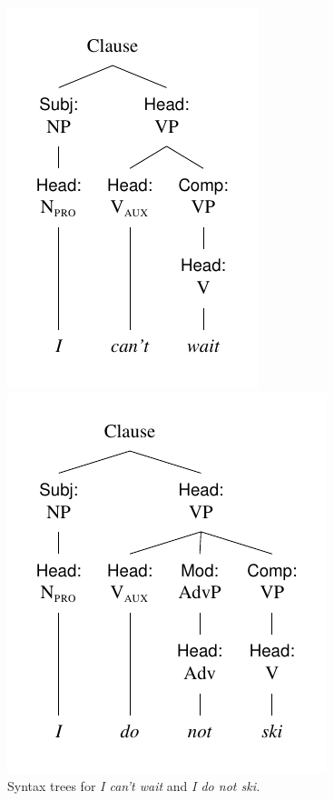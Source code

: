 \begin{figure}
    \begin{multicols}{2}
    \centering
    \includegraphics{figures/icantwait.pdf}
    \caption{Syntax trees for \textit{I can't wait} and \textit{I do not ski.}}
    \label{tree:icantwait}

    \centering
    \includegraphics{figures/idonotski.pdf}
    \end{multicols}
\end{figure}

